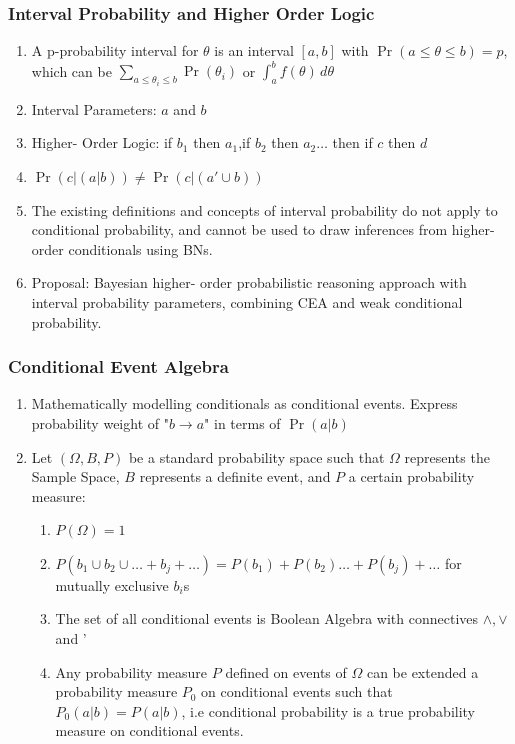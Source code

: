 \documentclass{beamer}
\providecommand{\pr}[1]{\ensuremath{\Pr\left(#1\right)}}
\begin{document}
\begin{frame}[fragile]
\frametitle{Interval Probability and Higher Order Logic}
\begin{enumerate}
    \item A {p-probability interval} for $\theta$ is an interval $[a,b]$ with $\pr{a \leq \theta \leq b} = p$, which can be $\sum_{a\leq \theta_i \leq b} \pr{\theta_i}$ or $\int_a^b f(\theta)\,d\theta$\\
    \item \alert{Interval Parameters:} $a$ and $b$
    \item {Higher- Order Logic:} if $b_1$ then $a_1$,if $b_2$ then $a_2 \ldots$ then if $c$ then $d$\\
    \item $\pr{c|(a|b)} \neq \pr{c|(a'\cup b)}$\\
    \item The existing definitions and concepts of interval probability do not apply to conditional probability, and cannot be used to draw inferences from higher- order conditionals using BNs.\\
    \item {Proposal:} Bayesian higher- order probabilistic reasoning approach with interval probability parameters, combining CEA and weak conditional probability.
\end{enumerate}
\end{frame}

\begin{frame}[fragile]
\frametitle{Conditional Event Algebra}
\begin{flushleft}
\begin{enumerate}
    \item Mathematically modelling conditionals as conditional events. Express probability weight of "$b \rightarrow a$" in terms of \pr{a|b}\\
    \item Let $(\Omega, B, P) $ be a standard probability space such that $\Omega$ represents the Sample Space, $B$ represents a definite event, and $P$ a certain probability measure:
    \begin{enumerate}
        \item $P(\Omega) =1$\\
        \item $P(b_1 \cup b_2 \cup \ldots  + b_j + \ldots) = P(b_1) + P(b_2) \ldots + P(b_j) + \ldots$ for mutually exclusive $b_i$s\\
        \item The set of all conditional events is Boolean Algebra with connectives $\wedge, \vee$ and ' \\
        \item Any probability measure $P$ defined on events  of $\Omega$ can be extended a probability measure $P_0$ on conditional events such that $P_0(a|b) = P(a|b)$, i.e conditional probability is a true probability measure on conditional events.
        
    \end{enumerate}
\end{enumerate}
\end{flushleft}

\end{frame}
\end{document}
